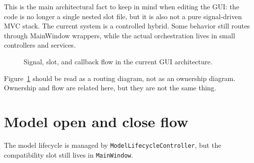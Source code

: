 This is the main architectural fact to keep in mind when editing the GUI: the code is no longer a single nested slot file, but it is also not a pure signal-driven MVC stack. The current system is a controlled hybrid. Some behavior still routes through MainWindow wrappers, while the actual orchestration lives in small controllers and services.

\begin{figure}[htbp]
\centering
\caption{Signal, slot, and callback flow in the current GUI architecture.}
\label{fig:gui-architecture-signal-flow}
\end{figure}

Figure~\ref{fig:gui-architecture-signal-flow} should be read as a routing diagram, not as an ownership diagram. Ownership and flow are related here, but they are not the same thing.

\section{Model open and close flow}
\label{sec:gui-architecture-model-open}

The model lifecycle is managed by \texttt{ModelLifecycleController}, but the compatibility slot still lives in \texttt{MainWindow}.


